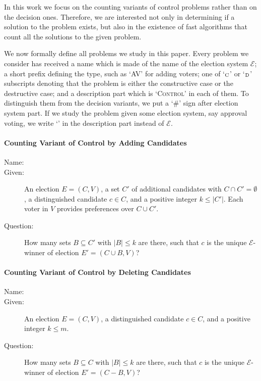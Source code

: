 In this work we focus on the counting variants of control problems rather than on the decision ones.
Therefore, we are interested not only in determining if a solution to the problem exists, but also in the existence of fast algorithms that count all the solutions to the given problem.

We now formally define all problems we study in this paper.
Every problem we consider has received a name which is made of the name of the election system $\mathcal{E}$; a short prefix defining the type, such as `AV' for adding voters; one of `${}_\textnormal{C}$' or `${}_\textnormal{D}$' subscripts denoting that the problem is either the constructive case or the destructive case; and a description part which is `\textsc{Control}' in each of them.
To distinguish them from the decision variants, we put a `\#' sign after election system part.
If we study the problem given some election system, say approval voting, we write `' in the description part instead of $\mathcal{E}$.

\paragraph{Counting Variant of Control by Adding Candidates}
\begin{description}
	\item[Name:] 
	\item[Given:] An election $E=(C,V)$, a set $C'$ of additional candidates with $C\cap C'=\emptyset$, a distinguished candidate $c\in C$, and a positive integer $k\le|C'|$.
	Each voter in $V$ provides preferences over $C\cup C'$.
	\item[Question:] How many sets $B\subseteq C'$ with $|B|\le k$ are there, such that $c$ is the unique $\mathcal{E}$-winner of election $E'=(C\cup B,V)$?
\end{description}

\paragraph{Counting Variant of Control by Deleting Candidates}
\begin{description}
	\item[Name:] 
	\item[Given:] An election $E=(C,V)$, a distinguished candidate $c\in C$, and a positive integer $k\le m$.
	\item[Question:] How many sets $B\subseteq C$ with $|B|\le k$ are there, such that $c$ is the unique $\mathcal{E}$-winner of election $E'=(C-B,V)$?
\end{description}


